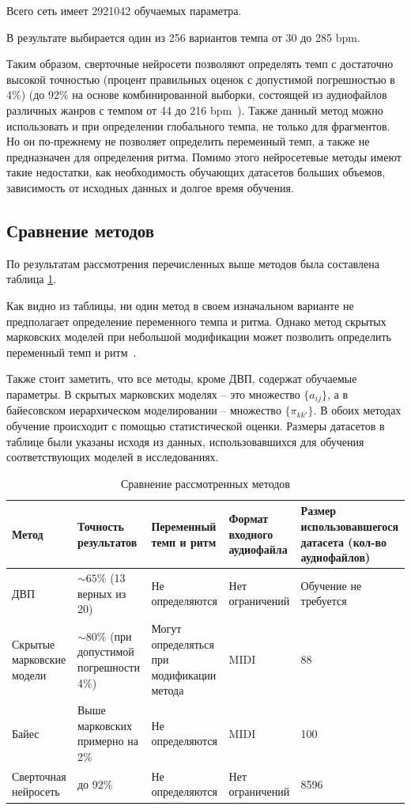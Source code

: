 Всего сеть имеет 2921042 обучаемых параметра.

В результате выбирается один из 256 вариантов темпа от 30 до 285 bpm.

Таким образом, сверточные нейросети позволяют определять темп с достаточно высокой точностью (процент правильных оценок с допустимой погрешностью в 4\%) (до 92\% на основе комбинированной выборки, состоящей из аудиофайлов различных жанров с темпом от 44 до 216 bpm~\cite{cnn}). Также данный метод можно использовать и при определении глобального темпа, не только для фрагментов. Но он по-прежнему не позволяет определить переменный темп, а также не предназначен для определения ритма. Помимо этого нейросетевые методы имеют такие недостатки, как необходимость обучающих датасетов больших объемов, зависимость от исходных данных и долгое время обучения.

\subsection{Сравнение методов}

По результатам рассмотрения перечисленных выше методов была составлена таблица \ref{tbl:compare}.

Как видно из таблицы, ни один метод в своем изначальном варианте не предполагает определение переменного темпа и ритма. Однако метод скрытых марковских моделей при небольшой модификации может позволить определить переменный темп и ритм~\cite{hmm}.

Также стоит заметить, что все методы, кроме ДВП, содержат обучаемые параметры. В скрытых марковских моделях -- это множество $\{a_{ij}\}$, а в байесовском иерархическом моделировании -- множество $\{\pi_{kk'}\}$. В обоих методах обучение происходит с помощью статистической оценки. Размеры датасетов в таблице были указаны исходя из данных, использовавшихся для обучения соответствующих моделей в исследованиях.

\begin{table}[h!]
	\begin{center}
		\caption{\label{tbl:compare}Сравнение рассмотренных методов}
		\begin{tabular}{|p{2.5cm}|p{3cm}|p{3cm}|p{3cm}|p{3cm}|}
			\hline
			Метод & Точность результатов & Переменный темп и ритм & Формат входного аудиофайла & Размер использовавшегося датасета (кол-во аудиофайлов) \\\hline
			ДВП & $\sim 65\%$ (13 верных из 20)~\cite{dwt} & Не определяются  & Нет ограничений & Обучение не требуется\\\hline
			Скрытые марковские модели & $\sim 80\%$ (при допустимой погрешности 4\%) & Могут определяться при модификации метода & MIDI & 88~\cite{hmm}\\\hline
			Байес & Выше марковских примерно на 2\% & Не определяются  & MIDI & 100~\cite{bayesian}\\\hline
			Сверточная нейросеть & до 92\%  & Не определяются  & Нет ограничений & 8596~\cite{cnn}\\\hline
		\end{tabular}
	\end{center}
\end{table}

